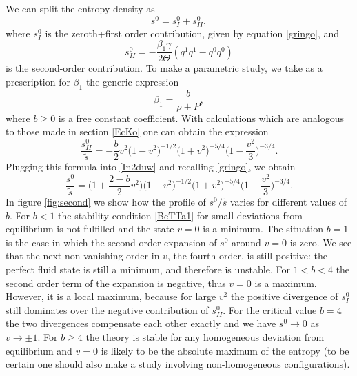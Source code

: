 \documentclass[a4paper, amsfonts, amssymb, amsmath, reprint, showkeys, nofootinbib, twoside]{revtex4-1}
\begin{document}
We can split the entropy density as 
\begin{equation}\label{In2duw}
s^0 = s^0_I + s^0_{II},
\end{equation}
where $s^0_I$ is the zeroth+first order contribution, given by equation \eqref{gringo}, and 
\begin{equation}\label{soii}
s^0_{II} = -\dfrac{\beta_1 \gamma}{2\Theta} (q^1 q^1-q^0 q^0)
\end{equation} 
is the second-order contribution. To make a parametric study, we take as a prescription for $\beta_1$ the generic expression
\begin{equation}
\beta_1 = \dfrac{b}{\rho +P},
\end{equation}
where $b \geq 0$ is a free constant coefficient. With calculations which are analogous to those made in section \ref{EcKo} one can obtain the expression
\begin{equation}
\dfrac{s^0_{II} }{\tilde{s}} = - \dfrac{b }{2} v^2 \bigg( 1-v^2 \bigg)^{-1/2} \bigg( 1+v^2 \bigg)^{-5/4} \bigg(1-\dfrac{v^2}{3} \bigg)^{-3/4}. 
\end{equation} 
Plugging this formula into \eqref{In2duw} and recalling \eqref{gringo}, we obtain
\begin{equation}\label{iltutto}
\dfrac{s^0}{\tilde{s}} =\bigg( 1+\dfrac{2-b}{2}v^2 \bigg) \bigg( 1-v^2 \bigg)^{-1/2} \bigg( 1+v^2 \bigg)^{-5/4} \bigg(1-\dfrac{v^2}{3} \bigg)^{-3/4}. 
\end{equation}
In figure \ref{fig:second} we show how the profile of $s^0/\tilde{s}$ varies for different values of $b$. 
For $b<1$ the stability condition \eqref{BeTTa1} for small deviations from equilibrium is not fulfilled and the state $v=0$ is a minimum. The situation $b=1$ is the case in which the second order expansion of $s^0$ around $v=0$ is zero. We see that the next non-vanishing order in $v$, the fourth order, is still positive: the perfect fluid state is still a minimum, and therefore is unstable. 
For $1<b<4$ the second order term of the expansion is negative, thus $v=0$ is a maximum. However, it is a local maximum, because for large $v^2$ the positive divergence of $s_I^0$ still dominates over the negative contribution of $s_{II}^0$. 
For the critical value $b=4$ the two divergences compensate each other exactly and we have $s^0 \rightarrow 0$ as $v\rightarrow \pm 1$. 
For $b \geq 4$ the theory is stable for any homogeneous deviation from equilibrium and $v=0$ is likely to be  the absolute maximum of the entropy (to be certain one should also make a study involving non-homogeneous configurations). 
\end{document}
